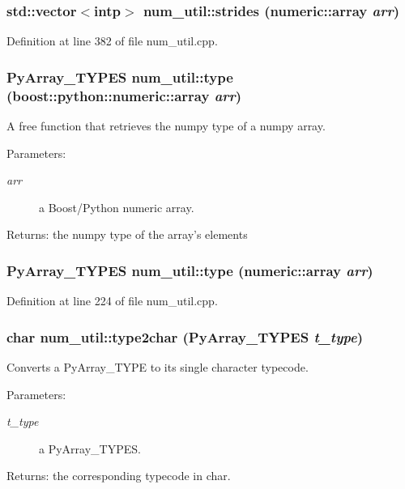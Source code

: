 \subsubsection{\setlength{\rightskip}{0pt plus 5cm}std::vector$<$intp$>$ num\_\-util::strides (numeric::array {\em arr})}\label{namespacenum__util_a52}




Definition at line 382 of file num\_\-util.cpp.
\subsubsection{\setlength{\rightskip}{0pt plus 5cm}Py\-Array\_\-TYPES num\_\-util::type (boost::python::numeric::array {\em arr})}\label{namespacenum__util_a65}


A free function that retrieves the numpy type of a numpy array. \begin{Desc}
\item[Parameters:]
\begin{description}
\item[{\em arr}]a Boost/Python numeric array. \end{description}
\end{Desc}
\begin{Desc}
\item[Returns:]the numpy type of the array's elements\end{Desc}
\subsubsection{\setlength{\rightskip}{0pt plus 5cm}Py\-Array\_\-TYPES num\_\-util::type (numeric::array {\em arr})}\label{namespacenum__util_a36}




Definition at line 224 of file num\_\-util.cpp.
\subsubsection{\setlength{\rightskip}{0pt plus 5cm}char num\_\-util::type2char (Py\-Array\_\-TYPES {\em t\_\-type})}\label{namespacenum__util_a56}


Converts a Py\-Array\_\-TYPE to its single character typecode. \begin{Desc}
\item[Parameters:]
\begin{description}
\item[{\em t\_\-type}]a Py\-Array\_\-TYPES. \end{description}
\end{Desc}
\begin{Desc}
\item[Returns:]the corresponding typecode in char.\end{Desc}


